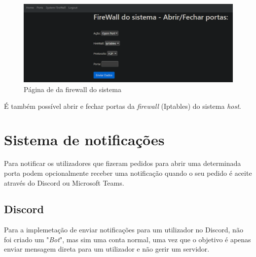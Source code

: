 \begin{figure}[H]
\begin{center}
\includegraphics[width=16cm]{figs/sysfirewall.png}
\caption{Página de da firewall do sistema}
\label{fig:bookstack}
\end{center}
\end{figure}

É também possível abrir e fechar portas da \textit{firewall} (Iptables) 
do sistema \textit{host}.









\section{Sistema de notificações}

Para notificar os utilizadores que fizeram pedidos para abrir uma determinada
porta podem opcionalmente receber uma notificação quando o seu pedido é aceite 
através do Discord ou Microsoft Teams.

\subsection{Discord}

Para a implemetação de enviar notificações para um utilizador no Discord,
não foi criado um "\textit{Bot}", mas sim uma conta normal, uma vez que o objetivo é apenas
enviar mensagem direta para um utilizador e não gerir um servidor.

